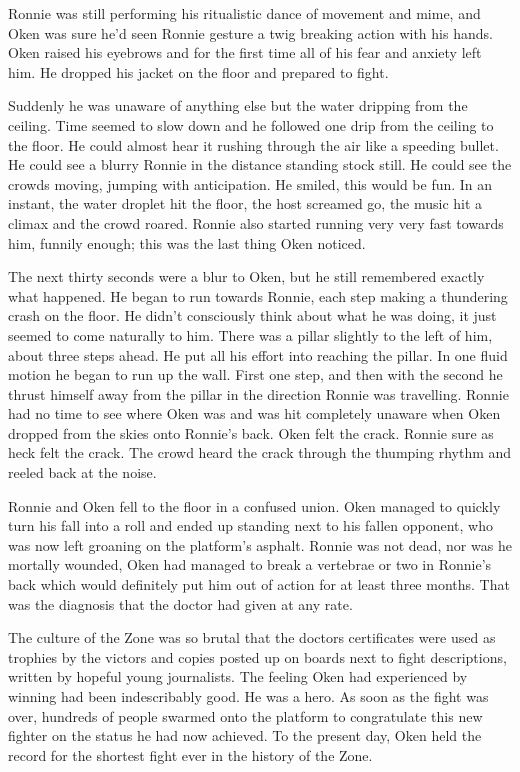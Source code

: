 Ronnie was still performing his ritualistic dance of movement and mime, and Oken was sure he'd seen Ronnie gesture a twig breaking action with his hands.  Oken raised his eyebrows and for the first time all of his fear and anxiety left him.  He dropped his jacket on the floor and prepared to fight.  

Suddenly he was unaware of anything else but the water dripping from the ceiling.  Time seemed to slow down and he followed one drip from the ceiling to the floor.  He could almost hear it rushing through the air like a speeding bullet.  He could see a blurry Ronnie in the distance standing stock still.  He could see the crowds moving, jumping with anticipation.  He smiled, this would be fun.  In an instant, the water droplet hit the floor, the host screamed go, the music hit a climax and the crowd roared.  Ronnie also started running very very fast towards him, funnily enough; this was the last thing Oken noticed.    

The next thirty seconds were a blur to Oken, but he still remembered exactly what happened.  He began to run towards Ronnie, each step making a thundering crash on the floor.  He didn't consciously think about what he was doing, it just seemed to come naturally to him.  There was a pillar slightly to the left of him, about three steps ahead.  He put all his effort into reaching the pillar.  In one fluid motion he began to run up the wall.  First one step, and then with the second he thrust himself away from the pillar in the direction Ronnie was travelling.  Ronnie had no time to see where Oken was and was hit completely unaware when Oken dropped from the skies onto Ronnie's back.  Oken felt the crack.  Ronnie sure as heck felt the crack.  The crowd heard the crack through the thumping rhythm and reeled back at the noise.  

Ronnie and Oken fell to the floor in a confused union.  Oken managed to quickly turn his fall into a roll and ended up standing next to his fallen opponent, who was now left groaning on the platform's asphalt.  Ronnie was not dead, nor was he mortally wounded, Oken had managed to break a vertebrae or two in Ronnie's back which would definitely put him out of action for at least three months.  That was the diagnosis that the doctor had given at any rate.



\thoughtbreak



The culture of the Zone was so brutal that the doctors certificates were used as trophies by the victors and copies posted up on boards next to fight descriptions, written by hopeful young journalists.  The feeling Oken had experienced by winning had been indescribably good.  He was a hero.  As soon as the fight was over, hundreds of people swarmed onto the platform to congratulate this new fighter on the status he had now achieved.  To the present day, Oken held the record for the shortest fight ever in the history of the Zone.  

